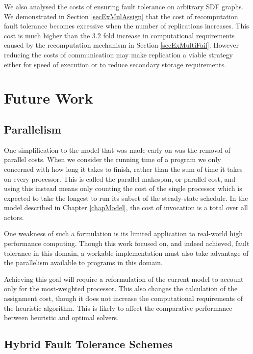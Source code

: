 We also analysed the costs of ensuring fault tolerance on arbitrary SDF graphs.
We demonstrated in Section \ref{secExMulAssign} that the cost of recomputation fault tolerance becomes excessive when the number of replications increases.
This cost is much higher than the 3.2 fold increase in computational requirements caused by the recomputation mechanism in Section \ref{secExMultiFail}.
However reducing the costs of communication may make replication a viable strategy either for speed of execution or to reduce secondary storage requirements.

\section{Future Work}
\label{secConFut}

\subsection{Parallelism}

One simplification to the model that was made early on was the removal of parallel costs.
When we consider the running time of a program we only concerned with how long it takes to finish, rather than the sum of time it takes on every processor.
This is called the parallel makespan, or parallel cost, and using this instead means only counting the cost of the single processor which is expected to take the longest to run its subset of the steady-state schedule.
In the model described in Chapter \ref{chapModel}, the cost of invocation is a total over all actors.

One weakness of such a formulation is its limited application to real-world high performance computing.
Though this work focused on, and indeed achieved, fault tolerance in this domain, a workable implementation must also take advantage of the parallelism available to programs in this domain.

Achieving this goal will require a reformulation of the current model to account only for the most-weighted processor.
This also changes the calculation of the assignment cost, though it does not increase the computational requirements of the heuristic algorithm.
This is likely to affect the comparative performance between heuristic and optimal solvers.

\subsection{Hybrid Fault Tolerance Schemes}

